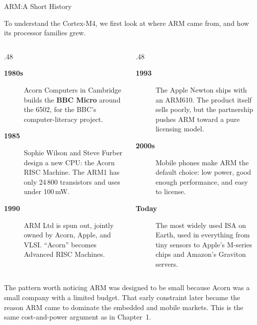 \documentclass[9pt,aspectratio=169,xcolor=table]{beamer}
\begin{document}
\begin{frame}{ARM:}{A Short History}
    {\small\centering To understand the Cortex-M4, we first look at where ARM came from, and how its processor families grew.\par}
    \vspace{2mm}
    \small
    \begin{columns}[T]
    \begin{column}{.48\textwidth}
        \begin{description}
            \item [\textbf{1980s}]  Acorn Computers in Cambridge builds the \textbf{BBC Micro} around the 6502, for the BBC's computer-literacy project.
            \item [\textbf{1985}]  Sophie Wilson and Steve Furber design a new CPU: the \alert{Acorn RISC Machine}. The ARM1 has only 24\,800 transistors and uses under 100\,mW.
            \item [\textbf{1990}]  ARM Ltd is spun out, jointly owned by Acorn, Apple, and VLSI. ``Acorn'' becomes \alert{Advanced RISC Machines}.
        \end{description}
    \end{column}
    \begin{column}{.48\textwidth}
        \begin{description}
            \item [\textbf{1993}]  The Apple Newton ships with an ARM610. The product itself sells poorly, but the partnership pushes ARM toward a pure licensing model.
            \item [\textbf{2000s}]  Mobile phones make ARM the default choice: low power, good enough performance, and easy to license.
            \item [\textbf{Today}]  The most widely used ISA on Earth, used in everything from tiny sensors to Apple's M-series chips and Amazon's Graviton servers.
        \end{description}
    \end{column}
    \end{columns}
    \vspace{2mm}
    \begin{block}{The pattern worth noticing}
        ARM was designed to be small because Acorn was a small company with a limited budget. That early constraint later became the reason ARM came to dominate the embedded and mobile markets. This is the same cost-and-power argument as in Chapter~1.
    \end{block}
\end{frame}
\end{document}
